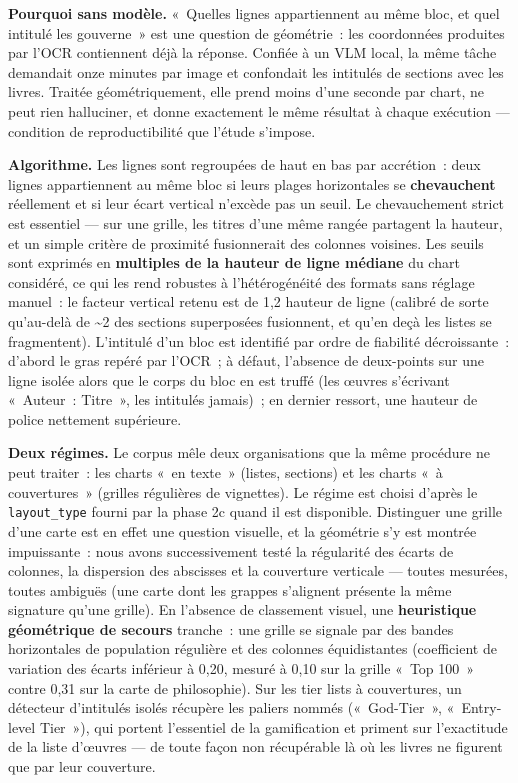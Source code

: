 \documentclass[11pt,a4paper]{article}
\begin{document}
\textbf{Pourquoi sans modèle.} «~Quelles lignes appartiennent au même bloc, et quel intitulé les gouverne~» est une question de géométrie~: les coordonnées produites par l'OCR contiennent déjà la réponse. Confiée à un VLM local, la même tâche demandait onze minutes par image et confondait les intitulés de sections avec les livres. Traitée géométriquement, elle prend moins d'une seconde par chart, ne peut rien halluciner, et donne exactement le même résultat à chaque exécution --- condition de reproductibilité que l'étude s'impose.

\textbf{Algorithme.} Les lignes sont regroupées de haut en bas par accrétion~: deux lignes appartiennent au même bloc si leurs plages horizontales se \textbf{chevauchent} réellement et si leur écart vertical n'excède pas un seuil. Le chevauchement strict est essentiel --- sur une grille, les titres d'une même rangée partagent la hauteur, et un simple critère de proximité fusionnerait des colonnes voisines. Les seuils sont exprimés en \textbf{multiples de la hauteur de ligne médiane} du chart considéré, ce qui les rend robustes à l'hétérogénéité des formats sans réglage manuel~: le facteur vertical retenu est de 1,2 hauteur de ligne (calibré de sorte qu'au-delà de \textasciitilde{}2 des sections superposées fusionnent, et qu'en deçà les listes se fragmentent). L'intitulé d'un bloc est identifié par ordre de fiabilité décroissante~: d'abord le gras repéré par l'OCR~; à défaut, l'absence de deux-points sur une ligne isolée alors que le corps du bloc en est truffé (les œuvres s'écrivant «~Auteur~: Titre~», les intitulés jamais)~; en dernier ressort, une hauteur de police nettement supérieure.

\textbf{Deux régimes.} Le corpus mêle deux organisations que la même procédure ne peut traiter~: les charts «~en texte~» (listes, sections) et les charts «~à couvertures~» (grilles régulières de vignettes). Le régime est choisi d'après le \texttt{layout\_type} fourni par la phase 2c quand il est disponible. Distinguer une grille d'une carte est en effet une question visuelle, et la géométrie s'y est montrée impuissante~: nous avons successivement testé la régularité des écarts de colonnes, la dispersion des abscisses et la couverture verticale --- toutes mesurées, toutes ambiguës (une carte dont les grappes s'alignent présente la même signature qu'une grille). En l'absence de classement visuel, une \textbf{heuristique géométrique de secours} tranche~: une grille se signale par des bandes horizontales de population régulière et des colonnes équidistantes (coefficient de variation des écarts inférieur à 0,20, mesuré à 0,10 sur la grille «~Top 100~» contre 0,31 sur la carte de philosophie). Sur les tier lists à couvertures, un détecteur d'intitulés isolés récupère les paliers nommés («~God-Tier~», «~Entry-level Tier~»), qui portent l'essentiel de la gamification et priment sur l'exactitude de la liste d'œuvres --- de toute façon non récupérable là où les livres ne figurent que par leur couverture.
\end{document}
